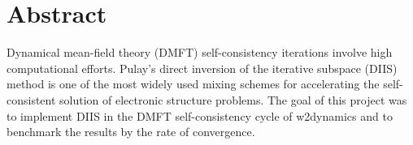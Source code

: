 \chapter*{Abstract}
\label{ch:abstract}

Dynamical mean-field theory (DMFT) self-consistency iterations involve high computational efforts. Pulay's direct inversion of the iterative subspace (DIIS) method is one of the most widely used mixing schemes for accelerating the self-consistent solution of electronic structure problems. The goal of this project was to implement DIIS in the DMFT self-consistency cycle of w2dynamics\cite{w2dyn} and to benchmark the results by the rate of convergence.

